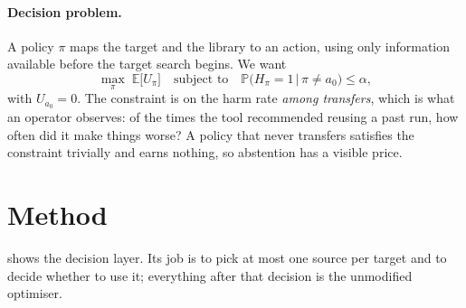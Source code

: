 \documentclass[11pt]{article}
\newcommand{\E}{\mathbb{E}}
\newcommand{\Prob}{\mathbb{P}}
\newcommand{\harm}{H}
\begin{document}
\paragraph{Decision problem.}
A policy $\pi$ maps the target and the library to an action, using only information available before the target
search begins. We want
\begin{equation}\label{eq:objective}
  \max_\pi \; \E\bigl[U_{\pi}\bigr] \quad\text{subject to}\quad
  \Prob\bigl(\harm_{\pi}=1 \,\big|\, \pi \neq a_0\bigr) \le \alpha,
\end{equation}
with $U_{a_0}=0$. The constraint is on the harm rate \emph{among transfers}, which is what an operator observes:
of the times the tool recommended reusing a past run, how often did it make things worse? A policy that never
transfers satisfies the constraint trivially and earns nothing, so abstention has a visible price.

\section{Method}\label{sec:method}

 shows the decision layer. Its job is to pick at most one source per target and to decide whether
to use it; everything after that decision is the unmodified optimiser.
\end{document}
